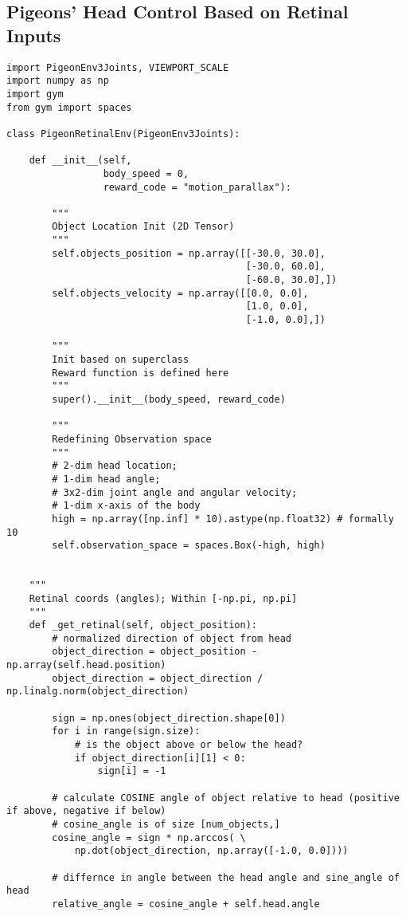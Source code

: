 \subsection{Pigeons' Head Control Based on Retinal Inputs}
\begin{lstlisting}
import PigeonEnv3Joints, VIEWPORT_SCALE
import numpy as np
import gym
from gym import spaces

class PigeonRetinalEnv(PigeonEnv3Joints):

    def __init__(self,
                 body_speed = 0,
                 reward_code = "motion_parallax"):

        """
        Object Location Init (2D Tensor)
        """
        self.objects_position = np.array([[-30.0, 30.0],
                                          [-30.0, 60.0],
                                          [-60.0, 30.0],])
        self.objects_velocity = np.array([[0.0, 0.0],
                                          [1.0, 0.0],
                                          [-1.0, 0.0],])

        """
        Init based on superclass
        Reward function is defined here
        """
        super().__init__(body_speed, reward_code)

        """
        Redefining Observation space
        """
        # 2-dim head location;
        # 1-dim head angle;
        # 3x2-dim joint angle and angular velocity;
        # 1-dim x-axis of the body
        high = np.array([np.inf] * 10).astype(np.float32) # formally 10
        self.observation_space = spaces.Box(-high, high)


    """
    Retinal coords (angles); Within [-np.pi, np.pi]
    """
    def _get_retinal(self, object_position):
        # normalized direction of object from head
        object_direction = object_position - np.array(self.head.position)
        object_direction = object_direction / np.linalg.norm(object_direction)

        sign = np.ones(object_direction.shape[0])
        for i in range(sign.size):
            # is the object above or below the head?
            if object_direction[i][1] < 0:
                sign[i] = -1

        # calculate COSINE angle of object relative to head (positive if above, negative if below)
        # cosine_angle is of size [num_objects,]
        cosine_angle = sign * np.arccos( \
            np.dot(object_direction, np.array([-1.0, 0.0])))

        # differnce in angle between the head angle and sine_angle of head
        relative_angle = cosine_angle + self.head.angle


\end{lstlisting}
